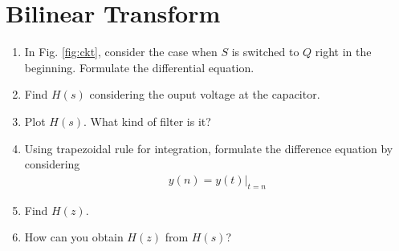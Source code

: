 \documentclass[journal,12pt,twocolumn]{IEEEtran}
\renewcommand\thesection{\arabic{section}}
\begin{document}
\section{Bilinear Transform}
\begin{enumerate}[label=\arabic*.,ref=\thesection.\theenumi]
\item In Fig. 
			\ref{fig:ckt},
			consider the case when $S$ is switched to $Q$ right in the beginning. Formulate the differential equation.
		\item Find $H(s)$ considering the ouput voltage at the capacitor.
		\item Plot $H(s)$.  What kind of filter is it?
		\item Using trapezoidal rule for integration, formulate the difference equation
			by considering 
		\begin{align}
			y(n) = y(t)\vert_{t=n}
		\end{align}
	\item Find $H(z)$.
	\item How can you obtain $H(z)$ from $H(s)$?
	\end{enumerate}
\end{document}
